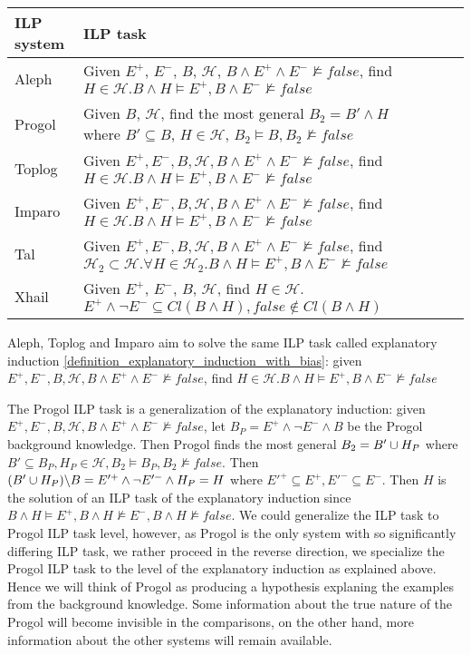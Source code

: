 \begin{center}
    \begin{tabular}{ | l | p{15cm} | l | p{5cm} |}
    \hline
    ILP system & ILP task\\ \hline
    Aleph & Given $E^{+}$, $E^{-}$, $B$, $\mathcal{H}$, $B \land E^{+} \land E^{-} \not\models false$, find $H \in \mathcal{H}. B \land H \models E^{+}, B \land E^{-} \not\models false$\\ \hline
    Progol & Given $B$, $\mathcal{H}$, find the most general $B_2 = B' \land H$ where $B' \subseteq B$, $H \in \mathcal{H}$, $B_2 \models B, B_2 \not\models false$\\ \hline
    Toplog & Given $E^{+}, E^{-}, B, \mathcal{H}, B \land E^{+} \land E^{-} \not\models false$, find $H \in \mathcal{H}. B \land H \models E^{+}, B \land E^{-} \not\models false$ \\ \hline
    Imparo & Given $E^{+}, E^{-}, B, \mathcal{H}, B \land E^{+} \land E^{-} \not\models false$, find $H \in \mathcal{H}. B \land H \models E^{+}, B \land E^{-} \not\models false$ \\ \hline
    Tal & Given $E^{+}, E^{-}, B, \mathcal{H}, B \land E^{+} \land E^{-} \not\models false$, find $\mathcal{H}_2 \subset \mathcal{H}. \forall H \in \mathcal{H}_2. B \land H \models E^{+}, B \land E^{-} \not\models false$ \\ \hline
    Xhail & Given $E^{+}$, $E^{-}$, $B$, $\mathcal{H}$, find $H \in \mathcal{H}$. $E^{+} \land \neg E^{-} \subseteq Cl(B \land H), false \not\in Cl(B \land H)$\\ \hline
    \end{tabular}
\end{center}

Aleph, Toplog and Imparo aim to solve the same ILP task called explanatory induction \ref{definition_explanatory_induction_with_bias}:
given $E^{+}, E^{-}, B, \mathcal{H}, B \land E^{+} \land E^{-} \not\models false$, find $H \in \mathcal{H}. B \land H \models E^{+}, B \land E^{-} \not\models false$

The Progol ILP task is a generalization of the explanatory induction: given $E^{+}, E^{-}, B, \mathcal{H}, B \land E^{+} \land E^{-} \not\models false$,
let $B_P=E^{+} \land \neg E^{-} \land B$ be the Progol background knowledge. Then Progol finds the most general $B_2 = B' \cup H_P$ where $B' \subseteq B_P, H_P \in \mathcal{H}, B_2 \models B_P, B_2 \not\models false$.
Then $(B' \cup H_P) \backslash B=E'^{+} \land \neg E'^- \land H_P = H$ where $E'^+ \subseteq E^+, E'^- \subseteq E^-$. Then $H$ is the solution of an ILP task of the explanatory induction since $B \land H \models E^{+}, B \land H \not\models E^{-}, B \land H \not\models false$. We could generalize the ILP task to Progol ILP task level, however, as Progol is the only system with so significantly differing ILP task, we rather proceed in the reverse direction, we specialize the Progol ILP task to the level of the explanatory induction as explained above. Hence we will think of Progol as producing a hypothesis explaning the examples from the background knowledge. Some information about the true nature of the Progol will become invisible in the comparisons, on the other hand, more information about the other systems will remain available.

